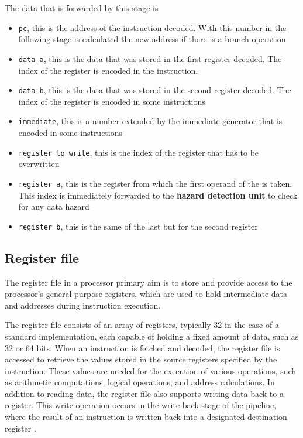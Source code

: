 \documentclass{article}
\begin{document}
The data that is forwarded by this stage is
\begin{itemize}
    \item \texttt{pc}, this is the address of the instruction decoded. With this number in the following stage is calculated the new address if there is a branch operation
    \item \texttt{data a}, this is the data that was stored in the first register decoded. The index of the register is encoded in the instruction.
    \item \texttt{data b}, this is the data that was stored in the second register decoded. The index of the register is encoded in some instructions
    \item \texttt{immediate}, this is a number extended by the immediate generator  that is encoded in some instructions
    \item \texttt{register to write}, this is the index of the register that has to be overwritten
    \item \texttt{register a}, this is the register from which the first operand of the \ALU is taken. This index is immediately forwarded to the \textbf{hazard detection unit}  to check for any data \gls{hazard}
    \item \texttt{register b}, this is the same of the last but for the second register
\end{itemize}

\subsection{Register file}\label{regfile}
The register file in a \RISCV processor primary aim is to store and provide access to the processor's general-purpose registers, which are used to hold intermediate data and addresses during instruction execution.

The register file consists of an array of registers, typically 32 in the case of a standard \RISCV implementation, each capable of holding a fixed amount of data, such as 32 or 64 bits. When an instruction is fetched and decoded, the register file is accessed to retrieve the values stored in the source registers specified by the instruction. These values are needed for the execution of various operations, such as arithmetic computations, logical operations, and address calculations. In addition to reading data, the register file also supports writing data back to a register. This write operation occurs in the write-back stage  of the pipeline, where the result of an instruction is written back into a designated destination register \cite{chatgpt}.
\end{document}
